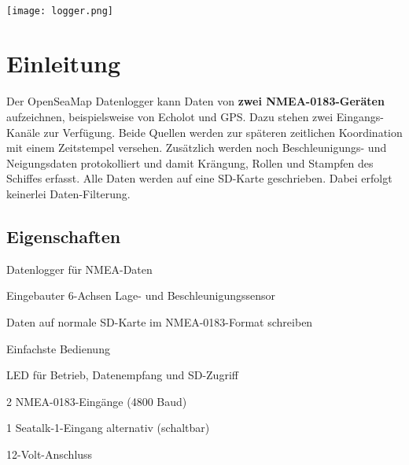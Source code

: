 \documentclass[pdftex, fontsize=8pt, paper=130mm:92mm,pagesize]{scrartcl}
\newcommand{\titel}{OpenSeaMap-Datenlogger}
\newcommand{\untertitel}{Bedienungs- und Installationsanleitung}
\newcommand{\autor}{Wilfried Klaas}
\newcommand{\firma}{OpenSeaMap Projekt}
\newcommand{\documentnr}{V0.1}
\let\stdsection\section
\renewcommand\section{\newpage\stdsection}
\begin{document}

\begin{titlepage}
	\raggedleft\textbf{\color{darkblue}{\Large \titel \\ \untertitel}}\\
	\vspace{6mm}
	\color{darkblue}{\hrule height2pt}
	\vspace{2mm}
	\centerline{\texttt{[image: logger.png]}}
\end{titlepage}

\tableofcontents
\clearpage
{}



\section{Einleitung}

Der OpenSeaMap Datenlogger kann Daten von \textbf{zwei NMEA-0183-Geräten} aufzeichnen, beispielsweise von Echolot und GPS. Dazu stehen zwei Eingangs-Kanäle zur Verfügung. Beide Quellen werden zur späteren zeitlichen Koordination mit einem Zeitstempel versehen. Zusätzlich werden noch Beschleunigungs- und Neigungsdaten protokolliert und damit Krängung, Rollen und Stampfen des Schiffes erfasst. Alle Daten werden auf eine SD-Karte geschrieben. Dabei erfolgt keinerlei Daten-Filterung. 

\subsection{Eigenschaften}

\begin{compactitem}
\item Datenlogger für NMEA-Daten 
\item Eingebauter 6-Achsen Lage- und Beschleunigungssensor
\item Daten auf normale SD-Karte im NMEA-0183-Format schreiben
\item Einfachste Bedienung
\item LED für Betrieb, Datenempfang und SD-Zugriff
\item 2 NMEA-0183-Eingänge (4800 Baud)
\item 1 Seatalk-1-Eingang alternativ (schaltbar) 
\item 12-Volt-Anschluss
\end{compactitem}
\end{document}
